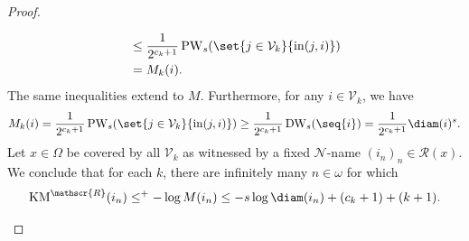 \begin{proof}
\begin{enumerate}[label = (\roman*)]
\begin{align*}
                &\leq \frac{1}{2^{c_k + 1}} \operatorname{PW}_s(\set{j \in \mathcal{V}_k}{\operatorname{in}(j, i)})\\ 
                &= M_k(i).
            \end{align*}
            The same inequalities extend to $M$. Furthermore, for any $i \in \mathcal{V}_k$, we have
            \begin{align*}
                M_k(i) = \frac{1}{2^{c_k + 1}} \operatorname{PW}_s(\set{j \in \mathcal{V}_k}{\operatorname{in}(j, i)}) \geq \frac{1}{2^{c_k + 1}} \operatorname{DW}_s(\seq{i}) = \frac{1}{2^{c_k + 1}} \diam(i)^s.
            \end{align*}
            Let $x \in \Omega$ be covered by all $\mathcal{V}_k$ as witnessed by a fixed $\mathcal{N}$-name $(i_n)_n \in \mathcal{R}(x)$. We conclude that for each $k$, there are infinitely many $n \in \omega$ for which
            \begin{align*}
                \operatorname{KM}^{\mathscr{R}}(i_n) \leq^+ - \log M(i_n) \leq - s \log \diam(i_n) + (c_k + 1) + (k + 1).
            \end{align*}
    \end{enumerate}
\end{proof}

